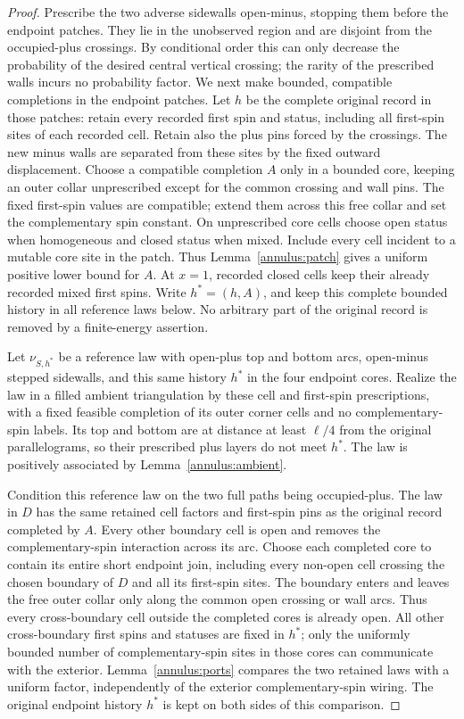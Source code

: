 \begin{proof}
Prescribe the two adverse sidewalls open-minus, stopping them before
the endpoint patches.  They lie in the unobserved region and are
disjoint from the occupied-plus crossings.  By conditional order this
can only decrease the probability of the desired central vertical
crossing; the rarity of the prescribed walls incurs no probability
factor.  We next make bounded, compatible completions in the endpoint
patches.  Let $h$ be the complete original record in those patches:
retain every recorded first spin and status, including all first-spin
sites of each recorded cell.  Retain also the plus pins forced by the
crossings.  The new minus walls are separated from these sites by the
fixed outward displacement.  Choose a compatible completion $A$ only
in a bounded core, keeping an outer collar unprescribed except for the
common crossing and wall pins.  The fixed first-spin values are
compatible; extend them across this free collar and set the
complementary spin constant.  On unprescribed core cells choose open
status when homogeneous and closed status when mixed.  Include every
cell incident to a mutable core site in the patch.  Thus
Lemma~\ref{annulus:patch} gives a uniform positive lower bound for $A$.
At $x=1$, recorded closed cells keep their already recorded mixed first
spins.  Write $h^*=(h,A)$, and keep this complete bounded history in all
reference laws below.  No arbitrary part of the original record is
removed by a finite-energy assertion.

Let $\nu_{S,h^*}$ be a reference law with open-plus top and bottom arcs,
open-minus stepped sidewalls, and this same history $h^*$ in the four
endpoint cores.  Realize the law in a filled ambient triangulation by
these cell and first-spin prescriptions, with a fixed feasible
completion of its outer corner cells and no complementary-spin labels.
Its top and bottom are at distance at least $\ell/4$ from the original
parallelograms, so their prescribed plus layers do not meet $h^*$.
The law is positively associated by Lemma~\ref{annulus:ambient}.

Condition this reference law on the two full paths being occupied-plus.
The law in $D$ has the same retained cell factors and first-spin pins
as the original record completed by $A$.  Every other boundary cell is
open and removes the complementary-spin interaction across its arc.
Choose each completed core to contain its entire short endpoint join,
including every non-open cell crossing the chosen boundary of $D$ and
all its first-spin sites.  The boundary enters and leaves the free outer
collar only along the common open crossing or wall arcs.  Thus every
cross-boundary cell outside the completed cores is already open.  All
other cross-boundary first spins and statuses are fixed in $h^*$; only
the uniformly bounded number of complementary-spin sites in those
cores can communicate with the exterior.  Lemma~\ref{annulus:ports} compares the
two retained laws with a uniform factor, independently of the exterior
complementary-spin wiring.  The original endpoint history $h^*$ is
kept on both sides of this comparison.


\end{proof}

